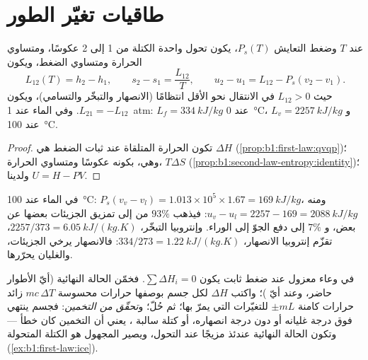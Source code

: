 \section{طاقيات تغيّر الطور}

\begin{proposition}\label{prop:b1:phase-changes:latent}
عند  $T$ وضغط التعايش $P_s(T)$، يكون
تحول واحدة الكتلة من  1 إلى  2 عكوسًا،
ومتساوي الحرارة ومتساوي الضغط، ويكون
\[
L_{12}(T) = h_2 - h_1 , \qquad s_2 - s_1 = \frac{L_{12}}{T} , \qquad
u_2 - u_1 = L_{12} - P_s(v_2 - v_1) .
\]
حيث $L_{12} > 0$ في الانتقال نحو  الأقل انتظامًا (الانصهار
والتبخّر والتسامي)، ويكون $L_{21} = -L_{12}$. وفي الماء عند \qty{1}{atm}:
$L_f = \qty{334}{kJ/kg}$ عند \qty{0}{\degreeCelsius}، و $L_v = \qty{2257}{kJ/kg}$ عند
\qty{100}{\degreeCelsius}.
\end{proposition}

\begin{proof}
تكون الحرارة المتلقاة عند ثبات الضغط هي $\Delta H$
(\cref{prop:b1:first-law:qvqp})؛ وهي، بكونه عكوسًا ومتساوي الحرارة،
$T\Delta S$ (\cref{prop:b1:second-law-entropy:identity})؛ ولدينا $U = H - PV$.
\end{proof}

\begin{example}\label{ex:b1:phase-changes:whereheat}
في الماء عند \qty{100}{\degreeCelsius}: $P_s(v_v - v_l) = 1.013 \times 10^5 \times
1.67 = \qty{169}{kJ/kg}$، ومنه $u_v - u_l = 2257 - 169 = \qty{2088}{kJ/kg}$:
فيذهب $93\%$ من  إلى تمزيق الجزيئات بعضها عن بعض، و $7\%$
إلى دفع الجوّ إلى الوراء. وإنتروبيا التبخّر،
$2257/373 = \qty{6.05}{kJ/(kg.K)}$، تقزّم إنتروبيا الانصهار، $334/273 =
\qty{1.22}{kJ/(kg.K)}$: فالانصهار يرخي الجزيئات، والغليان يحرّرها.
\end{example}

\begin{method}\label{meth:b1:phase-changes:calorimetry}
في وعاء معزول عند ضغط ثابت يكون $\sum\Delta H_i = 0$. فخمّن
الحالة النهائية (أيّ الأطوار حاضر، وعند أيّ )؛
واكتب $\Delta H$ لكل جسم بوصفها حرارات محسوسة $mc\,\Delta T$ زائد حرارات
كامنة $\pm mL$ للتغيّرات التي يمرّ بها؛ ثم حُلّ؛ و\emph{تحقّق من
التخمين}: فجسم ينتهي فوق درجة غليانه أو دون درجة انصهاره،
أو كتلة سالبة ، يعني أن التخمين كان خطأ --- وتكون
الحالة النهائية عندئذ مزيجًا عند  التحول، ويصير
المجهول هو الكتلة المتحولة (\cref{ex:b1:first-law:ice}).
\end{method}

